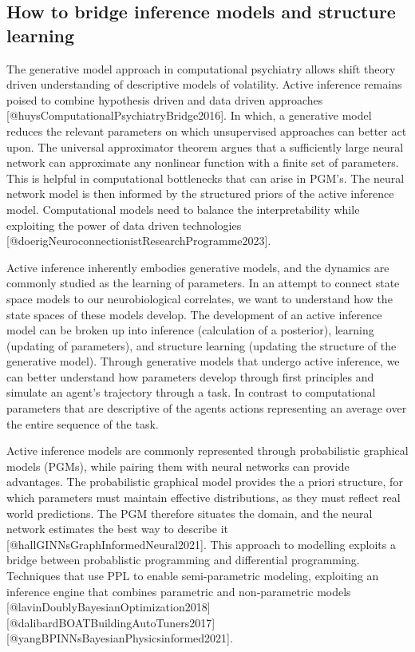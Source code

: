 \documentclass{article}
\begin{document}
\subsection{How to bridge inference models and structure learning}
The generative model approach in computational psychiatry allows shift theory driven understanding of descriptive models of volatility. Active inference remains poised to combine hypothesis driven and data driven approaches [@huysComputationalPsychiatryBridge2016]. In which, a generative model reduces the relevant parameters on which unsupervised approaches can better act upon. The universal approximator theorem argues that a sufficiently large neural network can approximate any nonlinear function with a finite set of parameters. This is helpful in computational bottlenecks that can arise in PGM's. The neural network model is then informed by the structured priors of the active inference model. Computational models need to balance the interpretability while exploiting the power of data driven technologies [@doerigNeuroconnectionistResearchProgramme2023].

Active inference inherently embodies generative models, and the dynamics are commonly studied as the learning of parameters. In an attempt to connect state space models to our neurobiological correlates, we want to understand how the state spaces of these models develop. The development of an active inference model can be broken up into inference (calculation of a posterior), learning (updating of parameters), and structure learning (updating the structure of the generative model). Through generative models that undergo active inference, we can better understand how parameters develop through first principles and simulate an agent's trajectory through a task. In contrast to computational parameters that are descriptive of the agents actions representing an average over the entire sequence of the task.

Active inference models are commonly represented through probabilistic graphical models (PGMs), while pairing them with neural networks can provide advantages. The probabilistic graphical model provides the a priori structure, for which parameters must maintain effective distributions, as they must reflect real world predictions. The PGM therefore situates the domain, and the neural network estimates the best way to describe it [@hallGINNsGraphInformedNeural2021]. This approach to modelling exploits a bridge between probablistic programming and differential programming. Techniques that use PPL to enable semi-parametric modeling, exploiting an inference engine that combines parametric and non-parametric models [@lavinDoublyBayesianOptimization2018] [@dalibardBOATBuildingAutoTuners2017] [@yangBPINNsBayesianPhysicsinformed2021].
\end{document}
